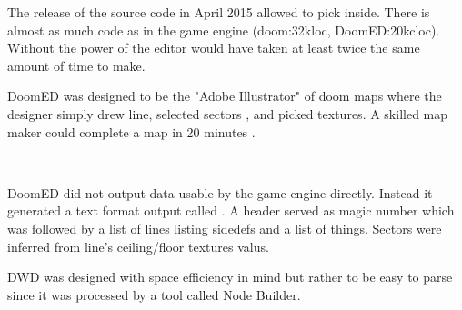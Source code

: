 The release of the source code in April 2015 allowed to pick inside. There is almost as much code as in the game engine (doom:32kloc, DoomED:20kcloc). Without the power of \NeXT the editor would have taken at least twice the same amount of time to make.\\
\par
{}
\par
DoomED was designed to be the "Adobe Illustrator" of doom maps where the designer simply drew line, selected sectors , and picked textures. A skilled map maker could complete a map in 20 minutes .\\
\par

\\
\par
{}
\par


DoomED did not output data usable by the game engine directly. Instead it generated a text format output called . A header served as magic number which was followed by a list of lines listing sidedefs and a list of things. Sectors were inferred from line's ceiling/floor textures valus.\\
\par
{}
\par
DWD was designed with space efficiency in mind but rather to be easy to parse since it was processed by a tool called Node Builder.\\
\par
{}
\par

\pagebreak





